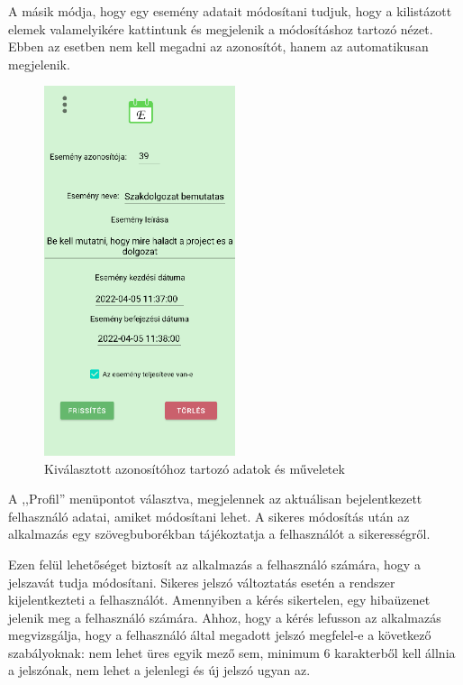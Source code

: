 \documentclass[
]{thesis-ekf}
\theoremstyle{definition}
\theoremstyle{remark}
\begin{document}
	A másik módja, hogy egy esemény adatait módosítani tudjuk, hogy a kilistázott elemek valamelyikére kattintunk és megjelenik a módosításhoz tartozó nézet. Ebben az esetben nem kell megadni az azonosítót, hanem az automatikusan megjelenik. 
	
	\begin{figure}[ht!]
		\centering
		\includegraphics[width=0.5\textwidth]{android_app/android_specify_event}
		\caption{Kiválasztott azonosítóhoz tartozó adatok és műveletek}
		\label{figure:android_specify_event}
	\end{figure}
	
	A ,,Profil'' menüpontot választva, megjelennek az aktuálisan bejelentkezett felhasználó adatai, amiket módosítani lehet. A sikeres módosítás után az alkalmazás egy szövegbuborékban tájékoztatja a felhasználót a sikerességről. 
	
	Ezen felül lehetőséget biztosít az alkalmazás a felhasználó számára, hogy a jelszavát tudja módosítani. Sikeres jelszó változtatás esetén a rendszer kijelentkezteti a felhasználót. Amennyiben a kérés sikertelen, egy hibaüzenet jelenik meg a felhasználó számára. Ahhoz, hogy a kérés lefusson az alkalmazás megvizsgálja, hogy a felhasználó által megadott jelszó megfelel-e a következő szabályoknak: nem lehet üres egyik mező sem, minimum 6 karakterből kell állnia a jelszónak, nem lehet a jelenlegi és új jelszó ugyan az.
	
\end{document}
